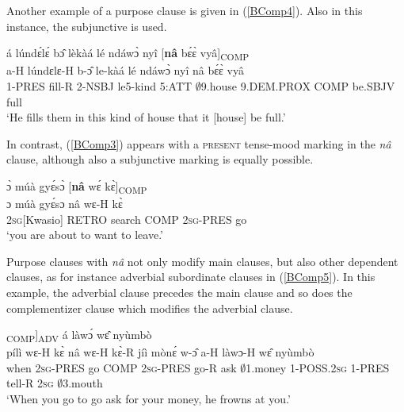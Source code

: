 Another example of a purpose clause is given in (\ref{BComp4}). Also in this instance, the subjunctive is used.

\begin{exe} 
\ex\label{BComp4}
  \glll á lúndɛ́lɛ́ bɔ̂ lèkàá lé ndáwɔ̀ nyî [{\bfseries nâ} bɛ́ɛ̀ vyâ]\textsubscript{COMP} \\
       a-H lúndɛlɛ-H b-ɔ̂ le-kàá lé ndáwɔ̀ nyî nâ bɛ́ɛ̀ vyâ \\
       1-PRES fill-R 2-NSBJ le5-kind 5:ATT $\emptyset$9.house 9.DEM.PROX COMP be.SBJV full \\
    \trans `He fills them in this kind of house that it [house] be full.'
\end{exe}

In contrast,  (\ref{BComp3}) appears with a \textsc{present} tense-mood marking in the {\itshape nâ} clause, although also a subjunctive marking is equally possible. 

\begin{exe} 
\ex\label{BComp3}
  \glll ɔ̀ múà gyɛ́sɔ̀ [{\bfseries nâ} wɛ́ kɛ̀]\textsubscript{COMP} \\
       ɔ múà gyɛ́sɔ nâ wɛ-H kɛ̀ \\
         2\textsc{sg}[Kwasio] RETRO search COMP 2\textsc{sg}-PRES go   \\
    \trans `you are about to want to leave.'
\end{exe}

Purpose clauses with {\itshape nâ} not only modify main clauses, but also other dependent clauses, as for instance adverbial subordinate clauses in (\ref{BComp5}). In this example, the adverbial clause precedes the main clause and so does the complementizer clause which modifies the adverbial clause.


\begin{exe} 
\ex\label{BComp5}
  \glll [pílì wɛ́ kɛ̀ [{\bfseries nâ}  wɛ́ kɛ́ jíì mònɛ́ wɔ̂]\textsubscript{COMP}]\textsubscript{ADV} á làwɔ́ wɛ̂ nyùmbò\\
        pílì wɛ-H kɛ̀ nâ  wɛ-H kɛ̀-R jíì mònɛ́ w-ɔ̂ a-H làwɔ-H wɛ̂ nyùmbò\\
        when 2\textsc{sg}-PRES go COMP 2\textsc{sg}-PRES go-R ask $\emptyset$1.money 1-POSS.2\textsc{sg} 1-PRES tell-R 2\textsc{sg} $\emptyset$3.mouth   \\
    \trans `When you go to go ask for your money, he frowns at you.'
\end{exe}



